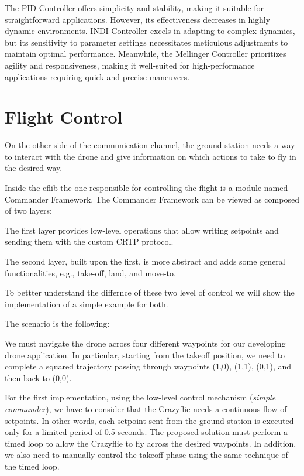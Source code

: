 The PID Controller offers simplicity and stability, making it suitable for straightforward applications. However, its effectiveness decreases in highly dynamic environments. 
INDI Controller excels in adapting to complex dynamics, but its sensitivity to parameter settings necessitates meticulous adjustments to maintain optimal performance.
Meanwhile, the Mellinger Controller prioritizes agility and responsiveness, making it well-suited for high-performance applications requiring quick and precise maneuvers. 


\section{Flight Control}\label{sec:flight_control}
On the other side of the communication channel, the ground station needs a way to interact with the drone and give information on which actions to take to fly in the desired way.


Inside the cflib the one responsible for controlling the flight is a module named Commander Framework.
The Commander Framework can be viewed as composed of two layers:

The first layer provides low-level operations that allow writing setpoints and sending them with the custom CRTP protocol.

The second layer, built upon the first, is more abstract and adds some general functionalities, e.g., take-off, land, and move-to.

To bettter understand the differnce of these two level of control we will show the implementation of a simple example for both.


The scenario is the following:
\begin{displayquote}
    We must navigate the drone across four different waypoints for our developing drone application.
    In particular, starting from the takeoff position, we need to complete a squared trajectory passing through waypoints (1,0), (1,1), (0,1), and then back to (0,0).
\end{displayquote}

For the first implementation, using the low-level control mechanism (\textit{simple commander}), we have to consider that the Crazyflie needs a continuous flow of setpoints. 
In other words, each setpoint sent from the ground station is executed only for a limited period of 0.5 seconds.
The proposed solution must perform a timed loop to allow the Crazyflie to fly across the desired waypoints.
In addition, we also need to manually control the takeoff phase using the same technique of the timed loop.

